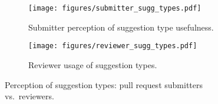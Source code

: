 \begin{figure*}[t]
\centering
\begin{subfigure}[b]{0.4\textwidth}
    \texttt{[image: figures/submitter\_sugg\_types.pdf]}
    \caption{Submitter perception of suggestion type usefulness.}
    \label{fig:submitter_acceptance}
\end{subfigure}
\hspace{2em}
\begin{subfigure}[b]{0.4\textwidth}
    \texttt{[image: figures/reviewer\_sugg\_types.pdf]}
    \caption{Reviewer usage of suggestion types.}
    \label{fig:reviewer_likelihood}
\end{subfigure}
\caption{Perception of suggestion types: pull request submitters vs.~reviewers.}
\label{fig:perception_suggestion_types}
\end{figure*}